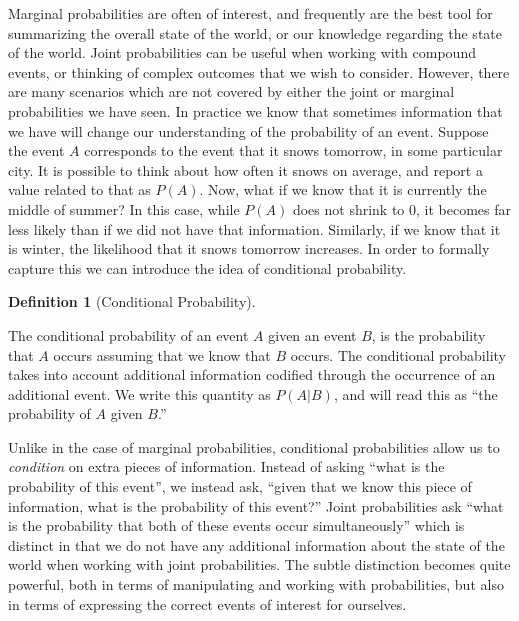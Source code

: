 \documentclass[
  letterpaper,
  DIV=11,
  numbers=noendperiod]{scrreprt}
\theoremstyle{definition}
\theoremstyle{definition}
\theoremstyle{definition}
\newtheorem{definition}{Definition}[chapter]
\theoremstyle{remark}
\begin{document}
Marginal probabilities are often of interest, and frequently are the
best tool for summarizing the overall state of the world, or our
knowledge regarding the state of the world. Joint probabilities can be
useful when working with compound events, or thinking of complex
outcomes that we wish to consider. However, there are many scenarios
which are not covered by either the joint or marginal probabilities we
have seen. In practice we know that sometimes information that we have
will change our understanding of the probability of an event. Suppose
the event \(A\) corresponds to the event that it snows tomorrow, in some
particular city. It is possible to think about how often it snows on
average, and report a value related to that as \(P(A)\). Now, what if we
know that it is currently the middle of summer? In this case, while
\(P(A)\) does not shrink to \(0\), it becomes far less likely than if we
did not have that information. Similarly, if we know that it is winter,
the likelihood that it snows tomorrow increases. In order to formally
capture this we can introduce the idea of conditional probability.

\begin{definition}[Conditional
Probability]\protect\hypertarget{def-conditional-probability}{}\label{def-conditional-probability}

The conditional probability of an event \(A\) given an event \(B\), is
the probability that \(A\) occurs assuming that we know that \(B\)
occurs. The conditional probability takes into account additional
information codified through the occurrence of an additional event. We
write this quantity as \(P(A|B)\), and will read this as ``the
probability of \(A\) given \(B\).''

\end{definition}

Unlike in the case of marginal probabilities, conditional probabilities
allow us to \emph{condition} on extra pieces of information. Instead of
asking ``what is the probability of this event'', we instead ask,
``given that we know this piece of information, what is the probability
of this event?'' Joint probabilities ask ``what is the probability that
both of these events occur simultaneously'' which is distinct in that we
do not have any additional information about the state of the world when
working with joint probabilities. The subtle distinction becomes quite
powerful, both in terms of manipulating and working with probabilities,
but also in terms of expressing the correct events of interest for
ourselves.
\end{document}

